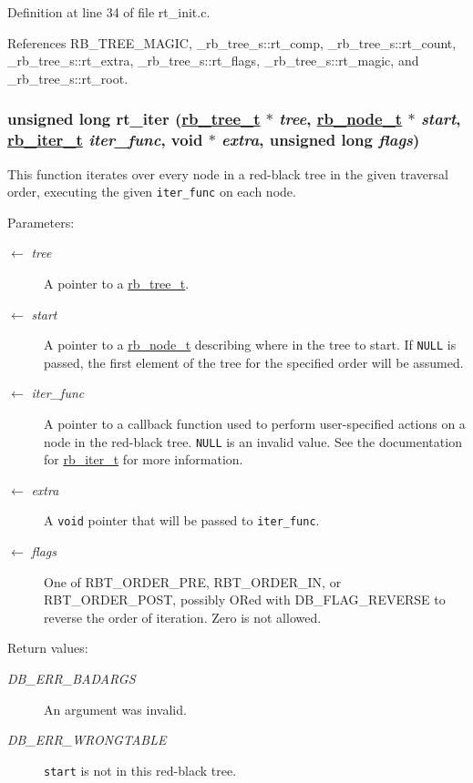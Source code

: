 Definition at line 34 of file rt\_\-init.c.

References RB\_\-TREE\_\-MAGIC, \_\-rb\_\-tree\_\-s::rt\_\-comp, \_\-rb\_\-tree\_\-s::rt\_\-count, \_\-rb\_\-tree\_\-s::rt\_\-extra, \_\-rb\_\-tree\_\-s::rt\_\-flags, \_\-rb\_\-tree\_\-s::rt\_\-magic, and \_\-rb\_\-tree\_\-s::rt\_\-root.\hypertarget{group__dbprim__rbtree_ga12}{
\subsubsection[rt\_\-iter]{\setlength{\rightskip}{0pt plus 5cm}unsigned long rt\_\-iter (\hyperlink{struct__rb__tree__s}{rb\_\-tree\_\-t} $\ast$ {\em tree}, \hyperlink{struct__rb__node__s}{rb\_\-node\_\-t} $\ast$ {\em start}, \hyperlink{group__dbprim__rbtree_ga2}{rb\_\-iter\_\-t} {\em iter\_\-func}, void $\ast$ {\em extra}, unsigned long {\em flags})}}
\label{group__dbprim__rbtree_ga12}


This function iterates over every node in a red-black tree in the given traversal order, executing the given {\tt iter\_\-func} on each node.

\begin{Desc}
\item[Parameters:]
\begin{description}
\item[\mbox{$\leftarrow$} {\em tree}]A pointer to a \hyperlink{group__dbprim__rbtree_ga0}{rb\_\-tree\_\-t}. \item[\mbox{$\leftarrow$} {\em start}]A pointer to a \hyperlink{group__dbprim__rbtree_ga1}{rb\_\-node\_\-t} describing where in the tree to start. If {\tt NULL} is passed, the first element of the tree for the specified order will be assumed. \item[\mbox{$\leftarrow$} {\em iter\_\-func}]A pointer to a callback function used to perform user-specified actions on a node in the red-black tree. {\tt NULL} is an invalid value. See the documentation for \hyperlink{group__dbprim__rbtree_ga2}{rb\_\-iter\_\-t} for more information. \item[\mbox{$\leftarrow$} {\em extra}]A {\tt void} pointer that will be passed to {\tt iter\_\-func}. \item[\mbox{$\leftarrow$} {\em flags}]One of RBT\_\-ORDER\_\-PRE, RBT\_\-ORDER\_\-IN, or RBT\_\-ORDER\_\-POST, possibly ORed with DB\_\-FLAG\_\-REVERSE to reverse the order of iteration. Zero is not allowed.\end{description}
\end{Desc}
\begin{Desc}
\item[Return values:]
\begin{description}
\item[{\em DB\_\-ERR\_\-BADARGS}]An argument was invalid. \item[{\em DB\_\-ERR\_\-WRONGTABLE}]{\tt start} is not in this red-black tree.\end{description}
\end{Desc}


